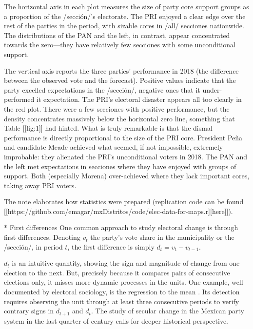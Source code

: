 \documentclass[letter,12pt]{article}
\begin{document}

The horizontal axis in each plot measures the size of party core support groups as a proportion of the /sección/'s electorate. The PRI enjoyed a clear edge over the rest of the parties in the period, with sizable cores in /all/ secciones nationwide. The distributions of the PAN and the left, in contrast, appear concentrated towards the zero---they have relatively few secciones with some unconditional support. 

The vertical axis reports the three parties' performance in 2018 (the difference between the observed vote and the forecast). Positive values indicate that the party excelled expectations in the /sección/, negative ones that it under-performed it expectation. The PRI's electoral disaster appears all too clearly in the red plot. There were a few secciones with positive performance, but the density concentrates massively below the horizontal zero line, something that Table [[fig:1]] had hinted. What is truly remarkable is that the dismal performance is directly proportional to the size of the PRI core. President Peña and candidate Meade achieved what seemed, if not impossible, extremely improbable: they alienated the PRI's unconditional voters in 2018. The PAN and the left met expectations in secciones where they have enjoyed with groups of support. Both (especially Morena) over-achieved where they lack important cores, taking away PRI voters. 

The note elaborates how statistics were prepared (replication code can be found [[https://github.com/emagar/mxDistritos/code/elec-data-for-maps.r][here]]).



* First differences
One common approach to study electoral change is through first differences. Denoting $v_t$ the party's vote share in the municipality or the /sección/, in period $t$, the first difference is simply $d_t = v_t - v_{t-1}$. 

$d_t$ is an intuitive quantity, showing the sign and magnitude of change from one election to the next. But, precisely because it compares pairs of consecutive elections only, it misses more dynamic processes in the units. One example, well documented by electoral sociology, is the regression to the mean \citep{campbell.1991,segovia.els1979}. Its detection requires observing the unit through at least three consecutive periods to verify contrary signs in $d_{t+1}$ and $d_t$. The study of secular change in the Mexican party system in the last quarter of century calls for deeper historical perspective. 
\end{document}
